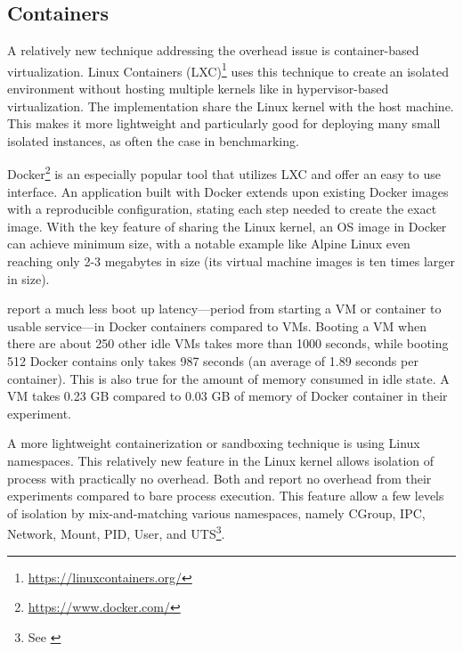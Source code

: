 \subsection{Containers}

A relatively new technique addressing the overhead issue is container-based virtualization.
Linux Containers (LXC)\footnote{\href{https://linuxcontainers.org/}{https://linuxcontainers.org/}} uses this technique to create an isolated environment without hosting multiple kernels like in hypervisor-based virtualization.
The implementation share the Linux kernel with the host machine.
This makes it more lightweight and particularly good for deploying many small isolated instances, as often the case in benchmarking.

Docker\footnote{\href{https://www.docker.com/}{https://www.docker.com/}} is an especially popular tool that utilizes LXC and offer an easy to use interface.
An application built with Docker extends upon existing Docker images with a reproducible  configuration, stating each step needed to create the exact image.
With the key feature of sharing the Linux kernel, an OS image in Docker can achieve minimum size, with a notable example like Alpine Linux even reaching only 2-3 megabytes in size (its virtual machine images is ten times larger in size).

\citet{zhangComparativeStudyContainers2018} report a much less boot up latency---period from starting a VM or container to usable service---in Docker containers compared to VMs.
Booting a VM when there are about 250 other idle VMs takes more than 1000 seconds, while booting 512 Docker contains only takes 987 seconds (an average of 1.89 seconds per container).
This is also true for the amount of memory consumed in idle state.
A VM takes 0.23 GB compared to 0.03 GB of memory of Docker container in their experiment.

A more lightweight containerization or sandboxing technique is using Linux namespaces.
This relatively new feature in the Linux kernel allows isolation of process with practically no overhead.
Both \citet{beyerReliableBenchmarkingRequirements2019} and \citet{marevs2012new} report no overhead from their experiments compared to bare process execution.
This feature allow a few levels of isolation by mix-and-matching various namespaces, namely CGroup, IPC, Network, Mount, PID, User, and UTS\footnote{See \href{http://man7.org/linux/man-pages/man7/namespaces.7.html}{}}.

